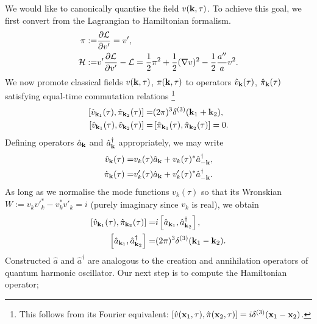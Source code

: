 We would like to canonically quantise the field $v(\mathbf{k},\tau)$. To achieve this goal, we first convert from the Lagrangian to Hamiltonian formalism.
\begin{align}
	\pi :=& \frac{\partial \mathcal{L}}{\partial v'} = v', \\
	\mathcal{H} :=& v'\frac{\partial \mathcal{L}}{\partial v'} - \mathcal{L} = \frac{1}{2} \pi^2 + \frac{1}{2} (\nabla v)^2 - \frac{1}{2} \frac{a''}{a} v^2 .
\end{align}
We now promote classical fields $v(\mathbf{k},\tau)$, $\pi(\mathbf{k},\tau)$ to operators $\hat{v}_\mathbf{k}(\tau)$, $\hat{\pi}_\mathbf{k}(\tau)$ satisfying equal-time commutation relations \footnote{This follows from its Fourier equivalent: $[\hat{v}(\mathbf{x}_1,\tau),\hat{\pi}(\mathbf{x}_2,\tau)] = i\delta^{(3)}(\mathbf{x}_1 - \mathbf{x}_2)$.}
\begin{align}
	\left[ \hat{v}_{\mathbf{k}_1}(\tau), \hat{\pi}_{\mathbf{k}_2}(\tau) \right] =& (2\pi)^3 \delta^{(3)}(\mathbf{k}_1 + \mathbf{k}_2), \\
	\left[ \hat{v}_{\mathbf{k}_1}(\tau), \hat{v}_{\mathbf{k}_2}(\tau) \right] =& \left[ \hat{\pi}_{\mathbf{k}_1}(\tau), \hat{\pi}_{\mathbf{k}_2}(\tau) \right] = 0.
\end{align}
Defining operators $\hat{a}_\mathbf{k}$ and $\hat{a}_\mathbf{k}^\dagger$ appropriately, we may write
\begin{align}
	\hat{v}_\mathbf{k} (\tau) =& v_k(\tau) \hat{a}_\mathbf{k} + v_k(\tau)^* \hat{a}_{-\mathbf{k}}^\dagger,  \\
	\hat{\pi}_\mathbf{k} (\tau) =& {v'_k}(\tau) \hat{a}_\mathbf{k} + {v'_k}(\tau)^* \hat{a}_{-\mathbf{k}}^\dagger.
\end{align}
As long as we normalise the mode functions $v_k(\tau)$ so that its Wronskian $W := v_k v'^*_k - v_k^* v'_k = i$ (purely imaginary since $v_k$ is real), we obtain
\begin{align}
	\left[ \hat{v}_{\mathbf{k}_1}(\tau), \hat{\pi}_{\mathbf{k}_2}(\tau) \right] =& i \left[ \hat{a}_{\mathbf{k}_1}, \hat{a}^\dagger_{\mathbf{k}_2} \right], \\
	\left[ \hat{a}_{\mathbf{k}_1}, \hat{a}^\dagger_{\mathbf{k}_2} \right] =& (2\pi)^3 \delta^{(3)}(\mathbf{k}_1 - \mathbf{k}_2).	
\end{align}
Constructed $\hat{a}$ and $\hat{a}^\dagger$ are analogous to the creation and annihilation operators of quantum harmonic oscillator. Our next step is to compute the Hamiltonian operator;
